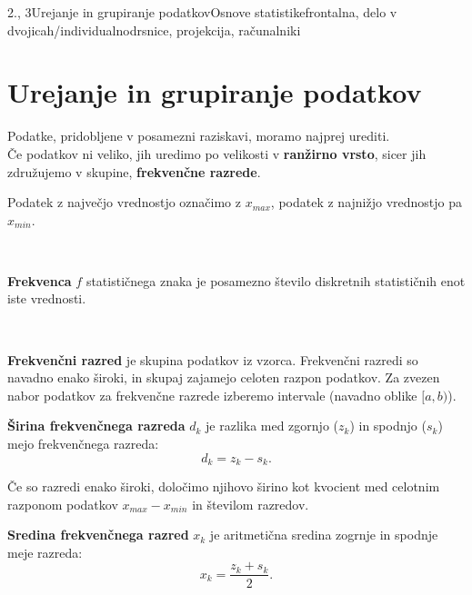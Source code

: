 \begin{priprava}{2., 3}{}{Urejanje in grupiranje podatkov}{Osnove statistike}{frontalna, delo v dvojicah/individualno}{drsnice, projekcija, računalniki}

    \section{Urejanje in grupiranje podatkov}

        

            
                Podatke, pridobljene v posamezni raziskavi, moramo najprej urediti. \\
                Če podatkov ni veliko, jih uredimo po velikosti v \textbf{ranžirno vrsto}, sicer jih združujemo v skupine, \textbf{frekvenčne razrede}.
            

            
                Podatek z največjo vrednostjo označimo z $x_{max}$, podatek z najnižjo vrednostjo pa $x_{min}$.
            
                ~
            
                \textbf{Frekvenca} $f$ statističnega znaka je posamezno število diskretnih statističnih enot iste vrednosti.
            
                ~
            
                \textbf{Frekvenčni razred} je skupina podatkov iz vzorca. Frekvenčni razredi so navadno enako široki,
                in skupaj zajamejo celoten razpon podatkov. Za zvezen nabor podatkov za frekvenčne razrede izberemo intervale (navadno oblike $[a,b)$).
            

        

        
            
                \textbf{Širina frekvenčnega razreda} $d_k$ je razlika med zgornjo ($z_k$) in spodnjo ($s_k$) mejo frekvenčnega razreda:
                $$d_k=z_k-s_k.$$
            

            
                Če so razredi enako široki, določimo njihovo širino kot kvocient med celotnim razponom podatkov $x_{max}-x_{min}$ in številom razredov.
            

            
                \textbf{Sredina frekvenčnega razred} $x_k$ je aritmetična sredina zogrnje in spodnje meje razreda: 
                $$x_k=\dfrac{z_k+s_k}{2}.$$
            
        


\end{priprava}
